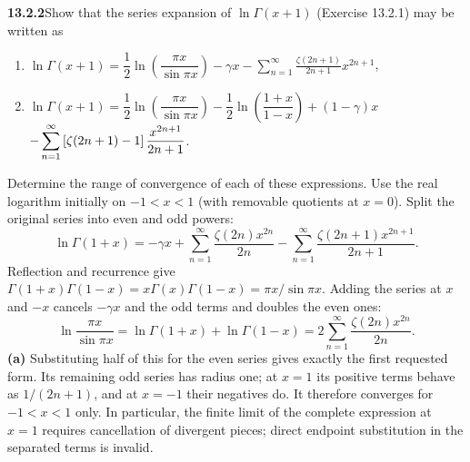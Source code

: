 \par\bigskip
\noindent\textbf{13.2.2}\quad Show that the series expansion of
$\ln\Gamma(x+1)$ (Exercise 13.2.1) may be written as
\begin{enumerate}
\item[(a)] $\ln\Gamma(x+1)=\dfrac{1}{2}\ln\left(\dfrac{\pi x}{\sin\pi x}\right)
  -\gamma x-\displaystyle\sum_{n=1}^{\infty}\frac{\zeta(2n+1)}{2n+1}x^{2n+1}$,
\item[(b)] $\ln\Gamma(x+1)=\dfrac{1}{2}\ln\left(\dfrac{\pi x}{\sin\pi x}\right)
  -\dfrac{1}{2}\ln\left(\dfrac{1+x}{1-x}\right)+(1-\gamma)x$\\[2pt]
  $\hfill-\displaystyle\sum_{n=1}^{\infty}
  \left[\zeta(2n+1)-1\right]\frac{x^{2n+1}}{2n+1}$.
\end{enumerate}
Determine the range of convergence of each of these expressions.
\solution
Use the real logarithm initially on $-1<x<1$ (with removable
quotients at $x=0$).  Split the original series into even and odd
powers:
\[
\ln\Gamma(1+x)=-\gamma x+
\sum_{n=1}^{\infty}\frac{\zeta(2n)x^{2n}}{2n}
-\sum_{n=1}^{\infty}\frac{\zeta(2n+1)x^{2n+1}}{2n+1}.
\]
Reflection and recurrence give
$\Gamma(1+x)\Gamma(1-x)=x\Gamma(x)\Gamma(1-x)=\pi x/\sin\pi x$.
Adding the series at $x$ and $-x$ cancels $-\gamma x$ and the odd
terms and doubles the even ones:
\[
\ln\frac{\pi x}{\sin\pi x}=\ln\Gamma(1+x)+\ln\Gamma(1-x)
=2\sum_{n=1}^{\infty}\frac{\zeta(2n)x^{2n}}{2n}.
\]
\textbf{(a)} Substituting half of this for the even series gives
exactly the first requested form.
Its remaining odd series has radius one; at $x=1$ its positive
terms behave as $1/(2n+1)$, and at $x=-1$ their negatives do.
It therefore converges for $\boxed{-1<x<1}$ only.  In particular,
the finite limit of the complete expression at $x=1$ requires
cancellation of divergent pieces; direct endpoint substitution
in the separated terms is invalid.

